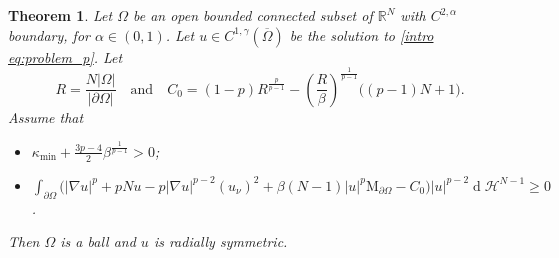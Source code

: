 \documentclass[10pt,a4paper]{amsart}
\numberwithin{equation}{section}
\newcommand{\R}{\mathbb{R}}
\newtheorem{teo}{Theorem}[section]
\renewcommand{\d}[1]{\ensuremath{\operatorname{d}\!{#1}}}
\begin{document}
\begin{teo}\label{thm rigidity serrin integral}
    Let $\Omega$ be an open bounded connected subset of $\R^N$ with $C^{2,\alpha}$ boundary, for $\alpha \in (0,1)$. Let $u \in C^{1,\gamma}(\overline{\Omega})$ be the solution to \eqref{intro eq:problem_p}. Let 
    \begin{equation*}
        R = \frac{N|\Omega|}{|\partial\Omega|} \quad \text{and} \quad  C_0 = (1-p)R^{\frac{p}{p-1}} - \left( \frac{R}{\beta} \right)^{\frac{1}{p-1}} \big( (p-1)N + 1 \big). 
    \end{equation*}
    Assume that 
    \begin{itemize}
            \item[(i)]  $\kappa_{\min} +  \frac{3p-4}{2} \beta^{\frac{1}{p-1}} > 0$;
    
            \item[(ii)] $\displaystyle \int_{\partial\Omega} \Big( |\nabla u|^p + pNu - p |\nabla u|^{p-2} (u_\nu)^2 + \beta(N-1) |u|^p \mathrm{M}_{\partial\Omega}  - C_0 \Big) |u|^{p-2} \d{}\mathcal{H}^{N-1} \geq 0$.
    \end{itemize}
    Then $\Omega$ is a ball and $u$ is radially symmetric.
\end{teo}
\end{document}
